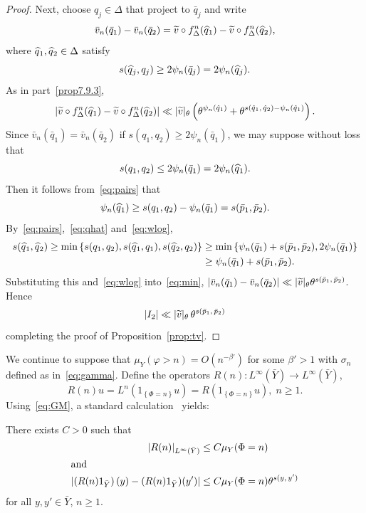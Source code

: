 \documentclass[10pt]{amsart}
\theoremstyle{definition}\newtheorem{defi}[theo]{Definition}\newtheorem{rema}[theo]{Remark}\newtheorem{exam}[theo]{Example}\newtheorem{exem}[theo]{Example}\newtheorem{nota}[theo]{Notation}
\newcommand{\tv}{\tilde{v}}
\newcommand{\bY}{\bar{Y}}
\let\oldtilde\tilde
\renewcommand*{\tilde}[1]{\mathchoice{\widetilde{#1}}{\widetilde{#1}}{\oldtilde{#1}}{\oldtilde{#1}}}
\let\oldhat\hat
\renewcommand*{\hat}[1]{\mathchoice{\widehat{#1}}{\widehat{#1}}{\oldhat{#1}}{\oldhat{#1}}}
\begin{document}
\begin{proof}
Next, choose $q_j\in\Delta$ that project to $\bar q_j$ and write
\[
\bar v_n(\bar q_1)-\bar v_n(\bar q_2)=
\tv\circ f_\Delta^n(\hat q_1)-\tv\circ f_\Delta^n(\hat q_2),
\]
where $\hat q_1,\hat q_2\in\Delta$ satisfy
\begin{equation}\label{eq:qhat}
s(\hat q_j,q_j)\ge 2\psi_n(\bar q_j) =2\psi_n(\hat q_j).
\end{equation}
As in part~\eqref{prop7.9.3},
\begin{equation}\label{eq:min}
\left|\tv\circ f_\Delta^n(\hat q_1)-\tv\circ f_\Delta^n(\hat q_2)\right|
\ll |\tv|_\theta \left(\theta^{\psi_n(\hat q_1)} +\theta^{s(\hat q_1,\,\hat q_2)-\psi_n(\hat q_1)}\right).
\end{equation}
Since $\bar v_n(\bar q_1)=\bar v_n(\bar q_2)$ if $s(q_1,q_2)\ge 2\psi_n(\bar q_1)$, we may suppose without loss that
\[
s(q_1,q_2)\le 2\psi_n(\bar q_1)=2\psi_n(\hat q_1).
\]
Then it follows from~\eqref{eq:pairs} that
\begin{equation}\label{eq:wlog}
\psi_n(\hat q_1)\ge s(q_1,q_2)-\psi_n(\bar q_1) =s(\bar p_1,\bar p_2).
\end{equation}
By~\eqref{eq:pairs},~\eqref{eq:qhat} and~\eqref{eq:wlog},
\begin{align*}
s(\hat q_1,\hat q_2)
\ge \min\left\{s(q_1,q_2),s(\hat q_1,q_1),s(\hat q_2,q_2)\right\} & \ge \min\left\{\psi_n(\bar q_1)+s(\bar p_1,\bar p_2),2\psi_n(\bar q_1)\right\}
\\ & \ge \psi_n(\bar q_1)+s(\bar p_1,\bar p_2).
\end{align*}
Substituting this and~\eqref{eq:wlog} into~\eqref{eq:min}, $|\bar v_n(\bar q_1)-\bar v_n(\bar q_2)|
\ll |\tv|_\theta \theta^{s(\bar p_1,\,\bar p_2)}$. Hence
\[
|I_2|\ll |\tv|_\theta\, \theta^{s(\bar p_1,\,\bar p_2)}
\]
completing the proof of Proposition~\ref{prop:tv}.
\end{proof}

We continue to suppose that $\mu_Y(\varphi>n)=O(n^{-\beta'})$ for some $\beta'>1$ with $\sigma_n$ defined as in~\eqref{eq:gamma}. Define the operators $R(n):L^\infty(\bY)\to L^\infty(\bY)$,
\[
R(n)u=L^n\left(1_{\left\{\Phi=n\right\}}u\right)=R\left(1_{\left\{\Phi=n\right\}}u\right),\;n\ge1.
\]
Using~\eqref{eq:GM}, a standard calculation~\cite{Gouezel04a,Sarig02} yields:

\begin{prop}\label{prop:GS}
There exists $C>0$ such that
\begin{align*}
|R(n)|_{L^\infty(\bY)} &\le C \mu_Y(\Phi=n)\\
\intertext{and}
\left|\left(R(n)1_{\bY}\right)(y)- (R(n)1_{\bY})(y')\right| &\le C \mu_Y(\Phi=n) \theta^{s(y,\,y')}
\end{align*}
for all $y,y'\in \bY$, $n\ge1$.
\end{prop}
\end{document}
